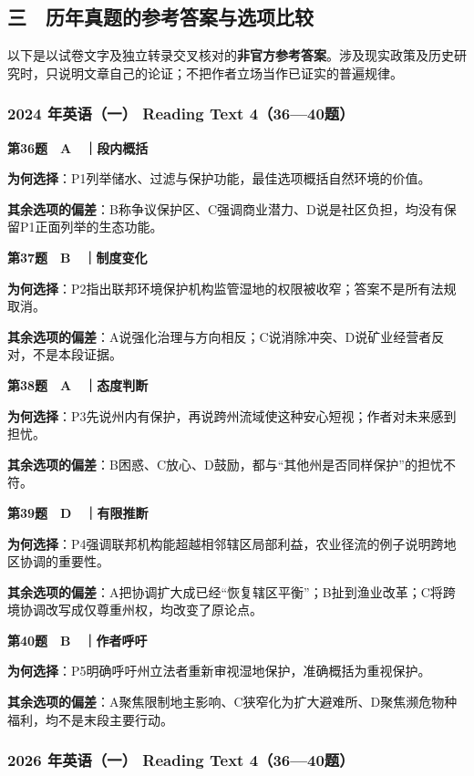 \documentclass[
  11pt,
]{ctexart}
\begin{document}
\subsection{三　历年真题的参考答案与选项比较}\label{ux4e09-ux5386ux5e74ux771fux9898ux7684ux53c2ux8003ux7b54ux6848ux4e0eux9009ux9879ux6bd4ux8f83}

以下是以试卷文字及独立转录交叉核对的\textbf{非官方参考答案}。涉及现实政策及历史研究时，只说明文章自己的论证；不把作者立场当作已证实的普遍规律。

\subsubsection{2024 年英语（一） Reading Text
4（36---40题）}\label{ux5e74ux82f1ux8bedux4e00-reading-text-43640ux9898}

\textbf{第36题　A　｜段内概括}

\textbf{为何选择}：P1列举储水、过滤与保护功能，最佳选项概括自然环境的价值。

\textbf{其余选项的偏差}：B称争议保护区、C强调商业潜力、D说是社区负担，均没有保留P1正面列举的生态功能。

\textbf{第37题　B　｜制度变化}

\textbf{为何选择}：P2指出联邦环境保护机构监管湿地的权限被收窄；答案不是所有法规取消。

\textbf{其余选项的偏差}：A说强化治理与方向相反；C说消除冲突、D说矿业经营者反对，不是本段证据。

\textbf{第38题　A　｜态度判断}

\textbf{为何选择}：P3先说州内有保护，再说跨州流域使这种安心短视；作者对未来感到担忧。

\textbf{其余选项的偏差}：B困惑、C放心、D鼓励，都与``其他州是否同样保护''的担忧不符。

\textbf{第39题　D　｜有限推断}

\textbf{为何选择}：P4强调联邦机构能超越相邻辖区局部利益，农业径流的例子说明跨地区协调的重要性。

\textbf{其余选项的偏差}：A把协调扩大成已经``恢复辖区平衡''；B扯到渔业改革；C将跨境协调改写成仅尊重州权，均改变了原论点。

\textbf{第40题　B　｜作者呼吁}

\textbf{为何选择}：P5明确呼吁州立法者重新审视湿地保护，准确概括为重视保护。

\textbf{其余选项的偏差}：A聚焦限制地主影响、C狭窄化为扩大避难所、D聚焦濒危物种福利，均不是末段主要行动。

\subsubsection{2026 年英语（一） Reading Text
4（36---40题）}\label{ux5e74ux82f1ux8bedux4e00-reading-text-43640ux9898-1}
\end{document}
